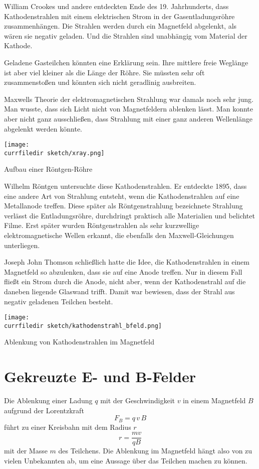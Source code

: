 William Crookes und andere entdeckten Ende des 19. Jahrhunderts, dass Kathodenstrahlen mit einem elektrischen Strom in der Gasentladungsröhre zusammenhängen. Die Strahlen werden durch ein Magnetfeld abgelenkt, als wären sie negativ geladen. Und die Strahlen sind unabhängig vom Material der Kathode.

Geladene Gasteilchen könnten eine Erklärung sein. Ihre mittlere freie Weglänge ist aber viel kleiner als die Länge der Röhre. Sie müssten sehr oft zusammenstoßen und könnten sich nicht geradlinig ausbreiten.

Maxwells Theorie der elektromagnetischen Strahlung war damals noch sehr jung. Man wusste, dass sich Licht nicht von Magnetfeldern ablenken lässt. Man konnte aber nicht ganz ausschließen, dass Strahlung mit einer ganz anderen Wellenlänge abgelenkt werden könnte.


\begin{marginfigure}
    \texttt{[image: \\currfiledir sketch/xray.png]}
    \caption{Aufbau einer Röntgen-Röhre}
\end{marginfigure}

Wilhelm Röntgen untersuchte diese Kathodenstrahlen. Er entdeckte 1895, dass eine andere Art von Strahlung entsteht, wenn die Kathodenstrahlen auf eine Metallanode treffen. Diese später als Röntgenstrahlung bezeichnete Strahlung verlässt die Entladungsröhre, durchdringt praktisch alle Materialien und belichtet Filme. Erst später wurden Röntgenstrahlen als sehr kurzwellige elektromagnetische Wellen erkannt, die ebenfalls den Maxwell-Gleichungen unterliegen.

Joseph John Thomson schließlich hatte die Idee, die Kathodenstrahlen in einem Magnetfeld so abzulenken, dass sie auf eine Anode treffen. Nur in diesem Fall fließt ein Strom durch die Anode, nicht aber, wenn der Kathodenstrahl auf die daneben liegende Glaswand trifft. Damit war bewiesen, dass der Strahl aus negativ geladenen Teilchen besteht.

\begin{marginfigure}
    \texttt{[image: \\currfiledir sketch/kathodenstrahl\_bfeld.png]}
    \caption{Ablenkung von  Kathodenstrahlen im Magnetfeld}
\end{marginfigure}


\section{Gekreuzte E- und B-Felder}

Die Ablenkung einer Ladung $q$ mit der Geschwindigkeit $v$ in einem Magnetfeld $B$ aufgrund der Lorentzkraft
\begin{equation}
    F_B = q \, v \, B
\end{equation}
führt zu einer Kreisbahn mit dem Radius $r$
\begin{equation}
    r = \frac{m v}{q B}
\end{equation}
mit der Masse $m$ des Teilchens. Die Ablenkung im Magnetfeld hängt also von zu vielen Unbekannten ab, um eine Aussage über das Teilchen machen zu können.


